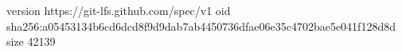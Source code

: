 version https://git-lfs.github.com/spec/v1
oid sha256:a05453134b6cd6dcd8f9d9dab7ab4450736dfae06e35c4702bae5e041f128d8d
size 42139
